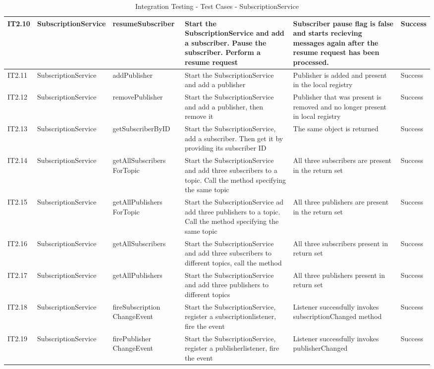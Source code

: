 \begin{table}[ht!]
\begin{tabular}{|m{0.5cm}|m{1.5cm}|m{1.5cm}|m{3cm}|m{3cm}|m{1.5cm}|}
IT2.10 & SubscriptionService & resumeSubscriber & Start the SubscriptionService and add a subscriber. Pause the subscriber. Perform a resume request & Subscriber pause flag is false and starts recieving messages again after the resume request has been processed. & Success \\ \hline
IT2.11 & SubscriptionService & addPublisher & Start the SubscriptionService and add a publisher & Publisher is added and present in the local registry & Success \\ \hline
IT2.12 & SubscriptionService & removePublisher & Start the SubscriptionService and add a publisher, then remove it & Publisher that was present is removed and no longer present in local registry & Success \\ \hline
IT2.13 & SubscriptionService & getSubscriberByID & Start the SubscriptionService, add a subscriber. Then get it by providing its subscriber ID & The same object is returned & Success \\ \hline
IT2.14 & SubscriptionService & getAllSubscribers ForTopic & Start the SubscriptionService and add three subscribers to a topic. Call the method specifying the same topic & All three subscribers are present in the return set & Success \\ \hline
IT2.15 & SubscriptionService & getAllPublishers ForTopic & Start the SubscriptionService ad add three publishers to a topic. Call the method specifying the same topic & All three publishers are present in the return set & Success \\ \hline
IT2.16 & SubscriptionService & getAllSubscribers & Start the SubscriptionService and add three subscribers to different topics, call the method & All three subscribers present in return set & Success \\ \hline
IT2.17 & SubscriptionService & getAllPublishers & Start the SubscriptionService and add three publishers to different topics & All three publishers present in return set & Success \\ \hline
IT2.18 & SubscriptionService & fireSubscription ChangeEvent & Start the SubscriptionService, register a subscriptionlistener, fire the event & Listener successfully invokes subscriptionChanged method & Success \\ \hline
IT2.19 & SubscriptionService & firePublisher ChangeEvent & Start the SubscriptionService, register a publisherlistener, fire the event & Listener successfully invokes publisherChanged & Success \\ \hline
\end{tabular}
\caption{Integration Testing - Test Cases - SubscriptionService}
\label{table:integration-testing-cases-subscriptionservice}
\end{table}

